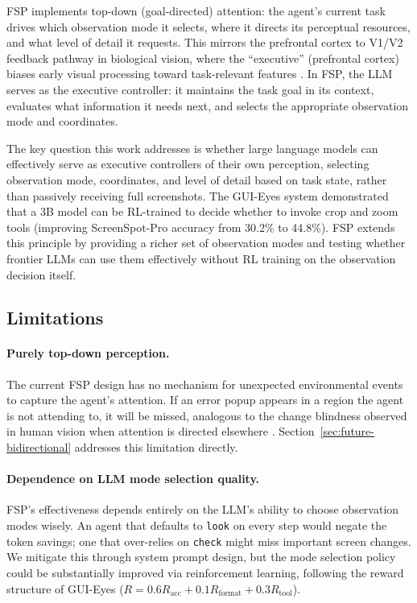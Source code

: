 \documentclass[11pt,a4paper]{article}
\begin{document}
FSP implements top-down (goal-directed) attention: the agent's current task drives which observation mode it selects, where it directs its perceptual resources, and what level of detail it requests. This mirrors the prefrontal cortex to V1/V2 feedback pathway in biological vision, where the ``executive'' (prefrontal cortex) biases early visual processing toward task-relevant features \cite{desimone-duncan-attention, corbetta2002control}. In FSP, the LLM serves as the executive controller: it maintains the task goal in its context, evaluates what information it needs next, and selects the appropriate observation mode and coordinates.

The key question this work addresses is whether large language models can effectively serve as executive controllers of their own perception, selecting observation mode, coordinates, and level of detail based on task state, rather than passively receiving full screenshots. The GUI-Eyes system \cite{gui-eyes} demonstrated that a 3B model can be RL-trained to decide whether to invoke crop and zoom tools (improving ScreenSpot-Pro accuracy from 30.2\% to 44.8\%). FSP extends this principle by providing a richer set of observation modes and testing whether frontier LLMs can use them effectively without RL training on the observation decision itself.

\subsection{Limitations}

\paragraph{Purely top-down perception.}
The current FSP design has no mechanism for unexpected environmental events to capture the agent's attention. If an error popup appears in a region the agent is not attending to, it will be missed, analogous to the change blindness observed in human vision when attention is directed elsewhere \cite{simons2005change}. Section~\ref{sec:future-bidirectional} addresses this limitation directly.

\paragraph{Dependence on LLM mode selection quality.}
FSP's effectiveness depends entirely on the LLM's ability to choose observation modes wisely. An agent that defaults to \texttt{look} on every step would negate the token savings; one that over-relies on \texttt{check} might miss important screen changes. We mitigate this through system prompt design, but the mode selection policy could be substantially improved via reinforcement learning, following the reward structure of GUI-Eyes \cite{gui-eyes} ($R = 0.6 R_{\text{acc}} + 0.1 R_{\text{format}} + 0.3 R_{\text{tool}}$).
\end{document}
